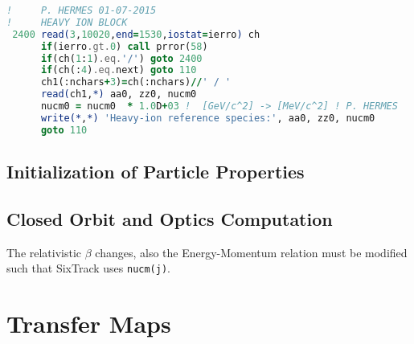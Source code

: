 \begin{lstlisting}[language=Fortran,caption=Definition of the new heavy-ion block in the fort.3 in the sixtrack.s file]
!     P. HERMES 01-07-2015
!     HEAVY ION BLOCK
 2400 read(3,10020,end=1530,iostat=ierro) ch
      if(ierro.gt.0) call prror(58)
      if(ch(1:1).eq.'/') goto 2400
      if(ch(:4).eq.next) goto 110
      ch1(:nchars+3)=ch(:nchars)//' / '                                                                                                                                 
      read(ch1,*) aa0, zz0, nucm0
      nucm0 = nucm0  * 1.0D+03 !  [GeV/c^2] -> [MeV/c^2] ! P. HERMES
      write(*,*) 'Heavy-ion reference species:', aa0, zz0, nucm0
      goto 110

\end{lstlisting}





\subsection{Initialization of Particle Properties}








\subsection{Closed Orbit and Optics Computation}

The relativistic $\beta$ changes, also the Energy-Momentum relation must be modified such that SixTrack uses \lstinline|nucm(j)|.





\section{Transfer Maps}




